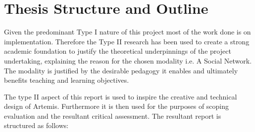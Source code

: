








\section{Thesis Structure and Outline}
\label{sec1:sec04}

Given the predominant Type I nature of this project most of the work done is on implementation. Therefore the Type II research has been used to create a strong academic foundation to justify the theoretical underpinnings of the project undertaking, explaining the reason for the chosen modality i.e. A Social Network. The modality is justified by the desirable pedagogy it enables and ultimately benefits teaching and learning objectives.

The type II aspect of this report is used to inspire the creative and technical design of Artemis. Furthermore it is then used for the purposes of scoping evaluation and the resultant critical assessment. The resultant report is structured as follows:

